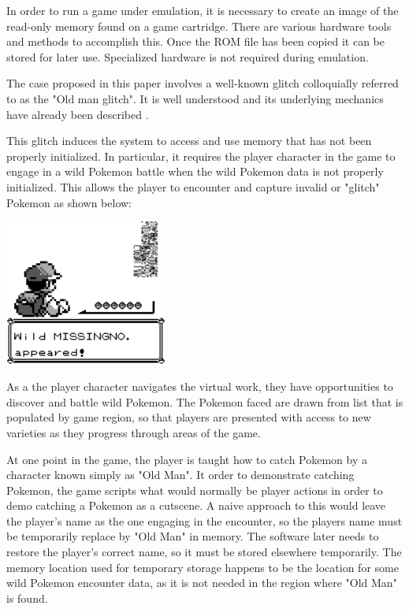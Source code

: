 \documentclass[letterpaper]{article}
\begin{document}
In order to run a game under emulation, it is necessary to create an image of the read-only memory found on a game cartridge. There are various hardware tools and methods to accomplish this. Once the ROM file has been copied it can be stored for later use. Specialized hardware is not required during emulation.

The case proposed in this paper involves a well-known glitch colloquially referred to as the "Old man glitch". It is well understood and its underlying mechanics have already been described \cite{bulbapedia2005} \cite{scrumpy2016missing}.

This glitch induces the system to access and use memory that has not been properly initialized. In particular, it requires the player character in the game to engage in a wild Pokemon battle when the wild Pokemon data is not properly initialized. This allows the player to encounter and capture invalid or "glitch" Pokemon as shown below:

\noindent %
\begin{minipage}{\textwidth}
    \centering
    \includegraphics[width=0.4\textwidth]{missingno.png}
    \label{fig:missingno}
\end{minipage}

As a the player character navigates the virtual work, they have opportunities to discover and battle wild Pokemon. The Pokemon faced are drawn from list that is populated by game region, so that players are presented with access to new varieties as they progress through areas of the game.

At one point in the game, the player is taught how to catch Pokemon by a character known simply as "Old Man". It order to demonstrate catching Pokemon, the game scripts what would normally be player actions in order to demo catching a Pokemon as a cutscene. A naive approach to this would leave the player's name as the one engaging in the encounter, so the players name must be temporarily replace by "Old Man" in memory. The software later needs to restore the player's correct name, so it must be stored elsewhere temporarily. The memory location used for temporary storage happens to be the location for some wild Pokemon encounter data, as it is not needed in the region where "Old Man" is found.
\end{document}
